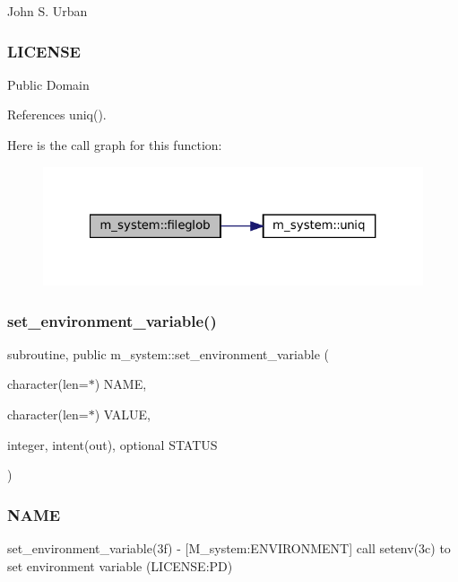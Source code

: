 John S. Urban \subsubsection*{L\+I\+C\+E\+N\+SE}

Public Domain 

References uniq().

Here is the call graph for this function\+:
\nopagebreak
\begin{figure}[H]
\begin{center}
\leavevmode
\includegraphics[width=321pt]{namespacem__system_a79656f76ad75168302e0d770052e901e_cgraph}
\end{center}
\end{figure}
\mbox{\label{namespacem__system_ad813765403a5d9d6fb7a2edcb669fe4b}} 
\subsubsection{\texorpdfstring{set\+\_\+environment\+\_\+variable()}{set\_environment\_variable()}}
{\footnotesize\ttfamily subroutine, public m\+\_\+system\+::set\+\_\+environment\+\_\+variable (\begin{DoxyParamCaption}\item[{character(len=$\ast$)}]{N\+A\+ME,  }\item[{character(len=$\ast$)}]{V\+A\+L\+UE,  }\item[{integer, intent(out), optional}]{S\+T\+A\+T\+US }\end{DoxyParamCaption})}



\subsubsection*{N\+A\+ME}

set\+\_\+environment\+\_\+variable(3f) -\/ \mbox{[}M\+\_\+system\+:E\+N\+V\+I\+R\+O\+N\+M\+E\+NT\mbox{]} call setenv(3c) to set environment variable (L\+I\+C\+E\+N\+SE\+:PD) 

